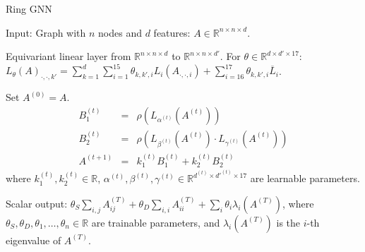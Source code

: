 \documentclass{beamer}
\begin{document}
\begin{frame}{Ring GNN}

{\small
Input: Graph with $n$ nodes and $d$ features: $A\in \mathbb R^{n\times n\times d}$.
\smallskip

Equivariant linear layer from $\mathbb{R}^{n \times n \times d}$ to $\mathbb{R}^{n \times n \times d'}$. For  $\theta \in \mathbb{R}^{d \times d' \times 17}$: $L_{\theta}(A)_{\cdot, \cdot, k'} = \sum_{k=1}^d \sum_{i=1}^{15} \theta_{k, k', i} L_i(A_{\cdot, \cdot, i}) + \sum_{i=16}^{17} \theta_{k, k', i} \overline{L}_i$.

Set $A^{(0)}=A$. 
\begin{eqnarray*}
B_1^{(t)}&=& \rho(L_{\alpha^{(t)}}(A^{(t)})) \\
B_2^{(t)}&=& \rho(L_{\beta^{(t)}}(A^{(t)})\cdot L_{\gamma^{(t)}}(A^{(t)})) \\
A^{(t+1)}&=& k_1^{(t)} B_1^{(t)} + k_2^{(t)} B_2^{(t)}
\end{eqnarray*}
where $k_1^{(t)}, k_2^{(t)} \in \mathbb{R}$, $\alpha^{(t)}, \beta^{(t)}, \gamma^{(t)} \in \mathbb{ R}^{d^{(t)} \times {d'}^{(t)} \times 17}$ are learnable parameters. 

Scalar output: $\theta_S \sum_{i,j} A_{ij}^{(T)} + \theta_D \sum_{i,i} A_{ii}^{(T)} + \sum_{i} \theta_{i} \lambda_{i}(A^{(T)})$, where $\theta_S, \theta_D, \theta_1, \ldots, \theta_n \in \mathbb{R}$ are trainable parameters, and  $\lambda_{i}(A^{(T)})$ is the $i$-th eigenvalue of $A^{(T)}$.
}
\end{frame}
\end{document}
